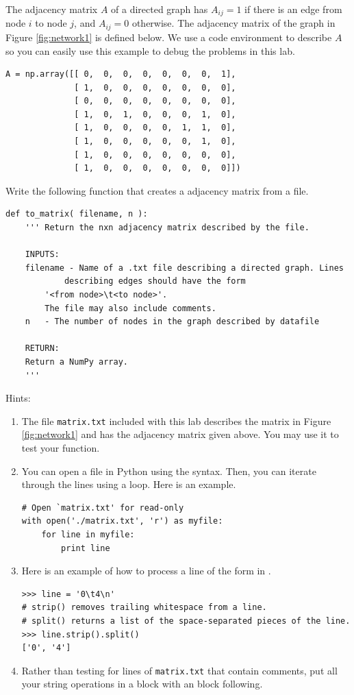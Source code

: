 The adjacency matrix $A$ of a directed graph has $A_{ij}=1$ if there is an edge from node $i$ to node $j$, and $A_{ij}=0$ otherwise.
The adjacency matrix of the graph in Figure \ref{fig:network1} is defined below.
We use a code environment to describe $A$ so you can easily use this example to debug the problems in this lab.
\begin{lstlisting}
A = np.array([[ 0,  0,  0,  0,  0,  0,  0,  1],
              [ 1,  0,  0,  0,  0,  0,  0,  0],
              [ 0,  0,  0,  0,  0,  0,  0,  0],
              [ 1,  0,  1,  0,  0,  0,  1,  0],
              [ 1,  0,  0,  0,  0,  1,  1,  0],
              [ 1,  0,  0,  0,  0,  0,  1,  0],
              [ 1,  0,  0,  0,  0,  0,  0,  0],
              [ 1,  0,  0,  0,  0,  0,  0,  0]])
\end{lstlisting}

\begin{problem}
Write the following function that creates a adjacency matrix from a file.
\begin{lstlisting}
def to_matrix( filename, n ):
    ''' Return the nxn adjacency matrix described by the file.

    INPUTS:
    filename - Name of a .txt file describing a directed graph. Lines
            describing edges should have the form
        '<from node>\t<to node>'.
        The file may also include comments.
    n   - The number of nodes in the graph described by datafile

    RETURN:
    Return a NumPy array.
    '''
\end{lstlisting}
Hints:
\begin{enumerate}
\item The file \texttt{matrix.txt} included with this lab describes the matrix in Figure \ref{fig:network1} and has the adjacency matrix  given above.
You may use it to test your function.

\item You can open a file in Python using the  syntax.
Then, you can iterate through the lines using a  loop.
Here is an example.
\begin{lstlisting}
# Open `matrix.txt' for read-only
with open('./matrix.txt', 'r') as myfile:
    for line in myfile:
        print line
\end{lstlisting}

\item Here is an example of how to process a line of the form in .
\begin{lstlisting}
>>> line = '0\t4\n'
# strip() removes trailing whitespace from a line.
# split() returns a list of the space-separated pieces of the line.
>>> line.strip().split()
['0', '4']
\end{lstlisting}

\item Rather than testing for lines of \texttt{matrix.txt} that contain comments, put all your string operations in a  block with an  block following.
\end{enumerate}
\end{problem}

